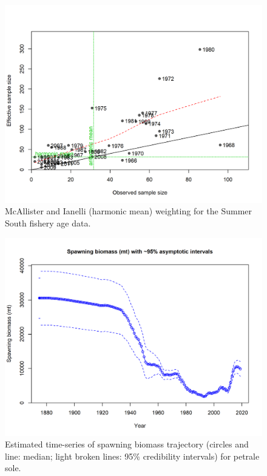 \documentclass[12pt,]{article}
\begin{document}
\FloatBarrier

\begin{figure}
\centering
\includegraphics{r4ss/plots_mod1/comp_agefit_sampsize_flt4mkt2.png}
\caption{McAllister and Ianelli (harmonic mean) weighting for the Summer
South fishery age data. \label{fig:harm_mean_wn_age}}
\end{figure}

\FloatBarrier

\begin{figure}
\centering
\includegraphics{r4ss/plots_mod1/ts7_Spawning_biomass_(mt)_with_95_asymptotic_intervals_intervals}
\caption{Estimated time-series of spawning biomass trajectory (circles
and line: median; light broken lines: 95\% credibility intervals) for
petrale sole. \label{fig:ssb}}
\end{figure}
\end{document}
